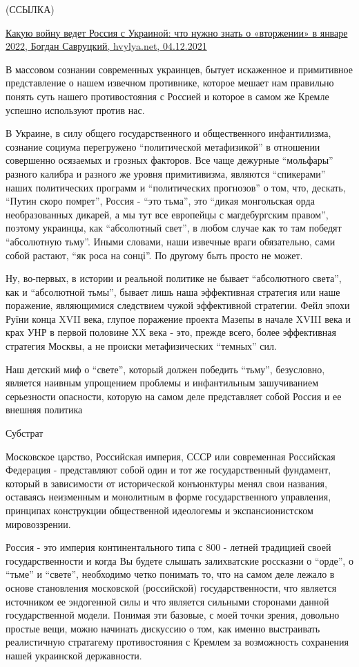 (ССЫЛКА) 

\href{https://hvylya.net/analytics/242912-kakuyu-voynu-vedet-rossiya-s-ukrainoy-chto-nuzhno-znat-o-vtorzhenii-v-yanvare-2022}{%
Какую войну ведет Россия с Украиной: что нужно знать о «вторжении» в январе 2022, Богдан Савруцкий, hvylya.net, 04.12.2021%
}

В массовом сознании современных украинцев, бытует искаженное и примитивное
представление о нашем извечном противнике, которое мешает нам правильно понять
суть нашего противостояния с Россией и которое в самом же Кремле успешно
используют против нас.

В Украине, в силу общего государственного и общественного инфантилизма,
сознание социума перегружено \enquote{политической метафизикой} в отношении совершенно
осязаемых и грозных факторов. Все чаще дежурные \enquote{мольфары} разного калибра и
разного же уровня примитивизма, являются \enquote{спикерами} наших политических
программ и \enquote{политических прогнозов} о том, что, дескать, \enquote{Путин скоро помрет},
Россия - \enquote{это тьма}, это \enquote{дикая монгольская орда необразованных дикарей, а мы
тут все европейцы с магдебургским правом}, поэтому украинцы, как \enquote{абсолютный
свет}, в любом случае как то там победят \enquote{абсолютную тьму}. Иными словами, наши
извечные враги обязательно, сами собой растают, \enquote{як роса на сонці}. По другому
быть просто не может.

Ну, во-первых, в истории и реальной политике не бывает \enquote{абсолютного света}, как
и \enquote{абсолютной тьмы}, бывает лишь наша эффективная стратегия или наше поражение,
являющимися следствием чужой эффективной стратегии. Фейл эпохи Руїни конца XVII
века, глупое поражение проекта Мазепы в начале XVIII века и крах УНР в первой
половине XX века - это, прежде всего, более эффективная стратегия Москвы, а не
происки метафизических \enquote{темных} сил.

Наш детский миф о \enquote{свете}, который должен победить \enquote{тьму}, безусловно, является
наивным упрощением проблемы и инфантильным зашучиванием серьезности опасности,
которую на самом деле представляет собой Россия и ее внешняя политика

Субстрат

Московское царство, Российская империя, СССР или современная Российская
Федерация - представляют собой один и тот же государственный фундамент, который
в зависимости от исторической конъюнктуры менял свои названия, оставаясь
неизменным и монолитным в форме государственного управления, принципах
конструкции общественной идеологемы и экспансионистском мировоззрении.

Россия - это империя континентального типа с 800 - летней традицией своей
государственности и когда Вы будете слышать залихватские россказни о \enquote{орде}, о
\enquote{тьме} и \enquote{свете}, необходимо четко понимать то, что на самом деле лежало в
основе становления московской (российской) государственности, что является
источником ее эндогенной силы и что является сильными сторонами данной
государственной модели. Понимая эти базовые, с моей точки зрения, довольно
простые вещи, можно начинать дискуссию о том, как именно выстраивать
реалистичную стратагему противостояния с Кремлем за возможность сохранения
нашей украинской державности.
